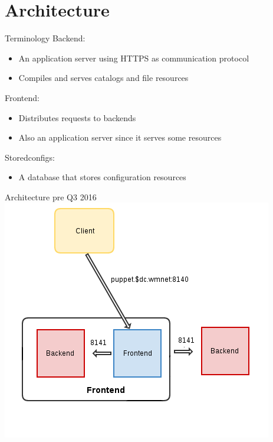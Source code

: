 \documentclass{beamer}
\begin{document}
\section{Architecture}
    \begin{frame}{Terminology}
        \pause Backend:
        \begin{itemize}
            \pause \item An application server using HTTPS as communication protocol
            \pause \item Compiles and serves catalogs and file resources
        \end{itemize}
        \pause Frontend:
        \begin{itemize}
            \pause \item Distributes requests to backends
            \pause \item Also an application server since it serves some resources
        \end{itemize}
        \pause Storedconfigs:
        \begin{itemize}
            \pause \item A database that stores configuration resources
        \end{itemize}
    \end{frame}
    \begin{frame}{Architecture pre Q3 2016}
        \includegraphics[width=\textwidth, height=\textheight]{Puppet-diagram_pre_q3_2016.png}
    \end{frame}
\end{document}
